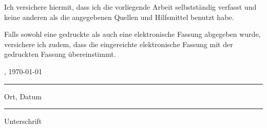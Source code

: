 
Ich versichere hiermit, dass ich die vorliegende Arbeit selbstständig verfasst und keine anderen als die angegebenen Quellen und Hilfsmittel benutzt habe.

Falls sowohl eine gedruckte als auch eine elektronische Fassung abgegeben wurde, 
versichere ich zudem, dass die eingereichte elektronische Fassung mit der gedruckten Fassung übereinstimmt.\bigskip \\

\parbox{6cm}{\centering \location, \today \hrule
\strut \centering\footnotesize Ort, Datum} \hfill\parbox{6cm}{\hrule
\strut \centering\footnotesize Unterschrift}
